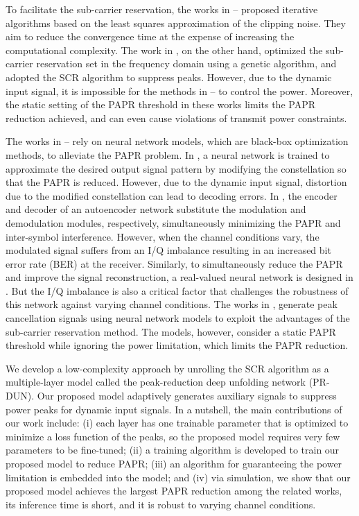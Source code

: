\documentclass[conference]{IEEEtran}
\begin{document}
To facilitate the sub-carrier reservation, the works in \cite{b2}–\cite{b4} proposed iterative algorithms based on the least squares approximation of the clipping noise. They aim to reduce the convergence time at the expense of increasing the computational complexity. The work in \cite{b5}, on the other hand, optimized the sub-carrier reservation set in the frequency domain using a genetic algorithm, and adopted the SCR algorithm to suppress peaks. However, due to the dynamic input signal, it is impossible for the methods in \cite{b2}–\cite{b5} to control the power. Moreover, the static setting of the PAPR threshold in these works limits the PAPR reduction achieved, and can even cause violations of transmit power constraints.

The works in \cite{b6}–\cite{b10} rely on neural network models, which are black-box optimization methods, to alleviate the PAPR problem. In \cite{b6}, a neural network is trained to approximate the desired output signal pattern by modifying the constellation so that the PAPR is reduced. However, due to the dynamic input signal, distortion due to the modified constellation can lead to decoding errors. In \cite{b7}, the encoder and decoder of an autoencoder network substitute the modulation and demodulation modules, respectively, simultaneously minimizing the PAPR and inter-symbol interference. However, when the channel conditions vary, the modulated signal suffers from an I/Q imbalance resulting in an increased bit error rate (BER) at the receiver. Similarly, to simultaneously reduce the PAPR and improve the signal reconstruction, a real-valued neural network is designed in \cite{b8}. But the I/Q imbalance is also a critical factor that challenges the robustness of this network against varying channel conditions. The works in \cite{b9}, \cite{b10} generate peak cancellation signals using neural network models to exploit the advantages of the sub-carrier reservation method. The models, however, consider a static PAPR threshold while ignoring the power limitation, which limits the PAPR reduction.

We develop a low-complexity approach by unrolling the SCR algorithm as a multiple-layer model called the peak-reduction deep unfolding network (PR-DUN). Our proposed model adaptively generates auxiliary signals to suppress power peaks for dynamic input signals. In a nutshell, the main contributions of our work include: (i) each layer has one trainable parameter that is optimized to minimize a loss function of the peaks, so the proposed model requires very few parameters to be fine-tuned; (ii) a training algorithm is developed to train our proposed model to reduce PAPR; (iii) an algorithm for guaranteeing the power limitation is embedded into the model; and (iv) via simulation, we show that our proposed model achieves the largest PAPR reduction among the related works, its inference time is short, and it is robust to varying channel conditions.
\end{document}
